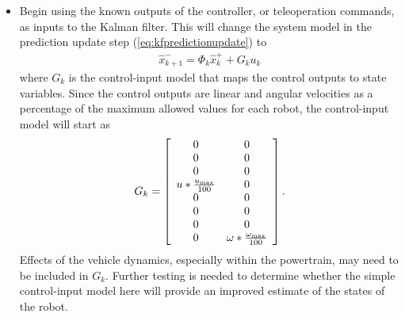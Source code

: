 \begin{itemize}
\item Begin using the known outputs of the controller, or teleoperation commands, as inputs to the Kalman filter. This will change the system model in the prediction update step (\ref{eq:kfpredictionupdate}) to
\begin{align*}
\hat{x}_{k+1}^- = \Phi_k \hat{x}_k^+ + G_ku_k
\end{align*}
where $G_k$ is the control-input model that maps the control outputs to state variables. Since the control outputs are linear and angular velocities as a percentage of the maximum allowed values for each robot, the control-input model will start as
\begin{align*}
G_k = \left[\begin{array}{c c}
0 & 0 \\
0 & 0 \\
0 & 0 \\
u * \frac{u_{\text{max}}}{100} & 0 \\
0 & 0 \\
0 & 0 \\
0 & 0 \\
0 & \omega * \frac{\omega_{\text{max}}}{100}
\end{array}\right].
\end{align*}
Effects of the vehicle dynamics, especially within the powertrain, may need to be included in $G_k$. Further testing is needed to determine whether the simple control-input model here will provide an improved estimate of the states of the robot.
\end{itemize}
